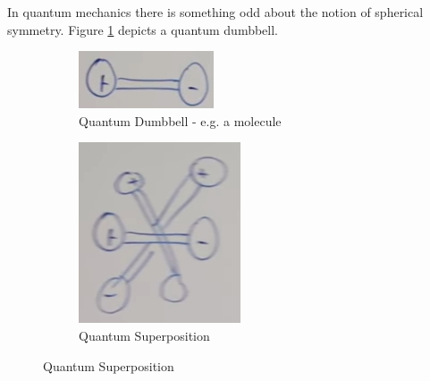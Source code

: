 \documentclass[]{article}
\begin{document}
In quantum mechanics there is something odd about  the notion of spherical symmetry. Figure \ref{fig:aqm-8-qm-dumbbell} depicts a quantum dumbbell.
\begin{figure}[H]
	\caption{Quantum Dumbbells and electric dipoles}
	\begin{subfigure}[t]{0.3\textwidth}
		\caption{Quantum Dumbbell - e.g. a molecule}\label{fig:aqm-8-qm-dumbbell}
		\includegraphics[width=\textwidth]{aqm-8-qm-dumbbell}
	\end{subfigure}
	\begin{subfigure}[t]{0.3\textwidth}
		\caption{Quantum Superposition}\label{fig:aqm-8-qm-dumbbell-superposition}
		\includegraphics[width=\textwidth]{aqm-8-qm-dumbbell-superposition}

\end{subfigure}
\end{figure}
\end{document}
